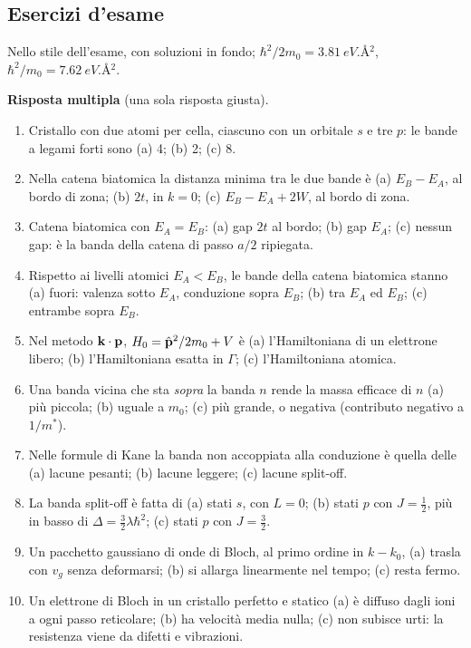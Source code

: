 \documentclass[11pt,a4paper]{article}
\begin{document}
\subsection*{Esercizi d'esame}
Nello stile dell'esame, con soluzioni in fondo; $\hbar^2/2m_0=\SI{3.81}{eV.\angstrom^2}$, $\hbar^2/m_0=\SI{7.62}{eV.\angstrom^2}$.

\textbf{Risposta multipla} (una sola risposta giusta).
\begin{enumerate}[label=\textbf{R\arabic*.}, leftmargin=2.3em, itemsep=2pt]
\item Cristallo con due atomi per cella, ciascuno con un orbitale $s$ e tre $p$: le bande a legami forti sono
(a) 4; (b) 2; (c) 8.
\item Nella catena biatomica la distanza minima tra le due bande è
(a) $E_B-E_A$, al bordo di zona; (b) $2t$, in $k=0$; (c) $E_B-E_A+2W$, al bordo di zona.
\item Catena biatomica con $E_A=E_B$:
(a) gap $2t$ al bordo; (b) gap $E_A$; (c) nessun gap: è la banda della catena di passo $a/2$ ripiegata.
\item Rispetto ai livelli atomici $E_A<E_B$, le bande della catena biatomica stanno
(a) fuori: valenza sotto $E_A$, conduzione sopra $E_B$; (b) tra $E_A$ ed $E_B$; (c) entrambe sopra $E_B$.
\item Nel metodo $\mathbf k\cdot\mathbf p$, $H_0=\hat{\mathbf p}^2/2m_0+V$ è
(a) l'Hamiltoniana di un elettrone libero; (b) l'Hamiltoniana esatta in $\Gamma$; (c) l'Hamiltoniana atomica.
\item Una banda vicina che sta \emph{sopra} la banda $n$ rende la massa efficace di $n$
(a) più piccola; (b) uguale a $m_0$; (c) più grande, o negativa (contributo negativo a $1/m^*$).
\item Nelle formule di Kane la banda non accoppiata alla conduzione è quella delle
(a) lacune pesanti; (b) lacune leggere; (c) lacune split-off.
\item La banda split-off è fatta di
(a) stati $s$, con $L=0$; (b) stati $p$ con $J=\frac12$, più in basso di $\Delta=\frac32\lambda\hbar^2$; (c) stati $p$ con $J=\frac32$.
\item Un pacchetto gaussiano di onde di Bloch, al primo ordine in $k-k_0$,
(a) trasla con $v_g$ senza deformarsi; (b) si allarga linearmente nel tempo; (c) resta fermo.
\item Un elettrone di Bloch in un cristallo perfetto e statico
(a) è diffuso dagli ioni a ogni passo reticolare; (b) ha velocità media nulla; (c) non subisce urti: la resistenza viene da difetti e vibrazioni.

\end{enumerate}
\end{document}

